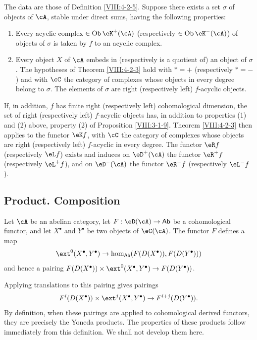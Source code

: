 \documentclass[oneside]{book}
\begin{document}
\begin{corollary}\label{VIII:4-2-3-2} %
The data are those of Definition \ref{VIII:4-2-5}. Suppose there exists a
set $\sigma$ of objects of $\cA$, stable under direct sums, having the
following properties:
\begin{enumerate}
  \item Every acyclic complex
    $\in \operatorname{Ob}{\eK^+(\cA)}$ (respectively
    $\in\operatorname{Ob}{\eK^-(\cA)}$) of objects of $\sigma$ is taken by
    $f$ to an acyclic complex.
  \item Every object $X$ of $\cA$ embeds in (respectively is a quotient of)
    an object of $\sigma$. The hypotheses of Theorem \ref{VIII:4-2-3}
    hold with $\ast=+$ (respectively $\ast=-$) and with $\cC$ the category
    of complexes whose objects in every degree belong to $\sigma$. The
    elements of $\sigma$ are right (respectively left) $f$-acyclic
    objects.
\end{enumerate}

If, in addition, $f$ has finite right (respectively left) cohomological
dimension, the set of right (respectively left) $f$-acyclic objects has,
in addition to properties (1) and (2) above, property (2) of Proposition
\ref{VIII:3-1-9}. Theorem \ref{VIII:4-2-3} then applies to the functor
$\eK f$, with $\cC$ the category of complexes whose objects are right
(respectively left) $f$-acyclic in every degree. The functor $\eR f$
(respectively $\eL f$) exists and induces on $\eD^+(\cA)$ the functor
$\eR^+ f$ (respectively $\eL^+ f$), and on $\eD^-(\cA)$ the functor
$\eR^- f$ (respectively $\eL^- f$).
\end{corollary}

\subsection{Product. Composition}\label{VIII:4-3}

Let $\cA$ be an abelian category, let
$F:\eD(\cA) \to \mathsf{Ab}$ be a cohomological functor, and let
$X^\bullet$ and $Y^\bullet$ be two objects of $\eC(\cA)$. The functor $F$
defines a map
\[
  \ext^0(X^\bullet,Y^\bullet) \to \hom_{\mathsf{Ab}}(F(D(X^\bullet)),F(D(Y^\bullet)))
\]
and hence a pairing
$F(D(X^\bullet))\times \ext^0(X^\bullet,Y^\bullet) \to F(D(Y^\bullet))$.

Applying translations to this pairing gives pairings
\[
  F^i(D(X^\bullet))\times \ext^j(X^\bullet,Y^\bullet) \to F^{i+j}(D(Y^\bullet)) \text{.}
\]
By definition, when these pairings are applied to cohomological derived
functors, they are precisely the Yoneda products. The properties of these
products follow immediately from this definition. We shall not develop
them here.
\end{document}
